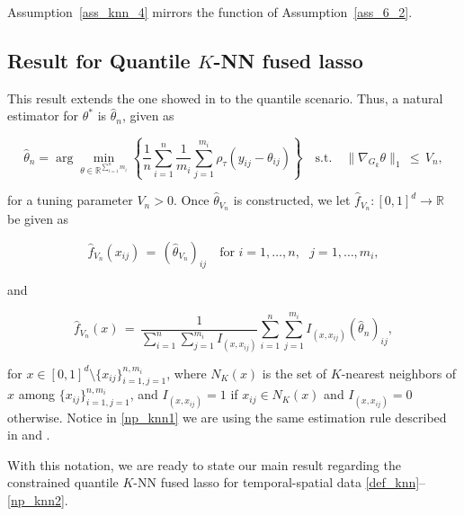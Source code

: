 \documentclass[twoside,11pt]{article}
\begin{document}
Assumption~\ref{ass_knn_4} mirrors the function of Assumption~\ref{ass_6_2}.



\subsection{Result for Quantile \( K \)-NN fused lasso}
This result extends the one showed in \cite{padilla2023temporal} to the quantile scenario. Thus, a natural estimator for \( \theta^* \) is \( \hat{\theta}_n \), given as

\begin{equation}
\label{def_knn}
\hat{\theta}_n = \arg\min_{\theta \in \mathbb{R}^{\sum_{i=1}^n m_i}} \left\{ \frac{1}{n} \sum_{i=1}^n \frac{1}{m_i} \sum_{j=1}^{m_i} \rho_{\tau}(y_{ij} - \theta_{ij}) \right\} \quad \text{s.t.} \quad \|\nabla_{G_k} \theta\|_1 \,\leq\, V_n,
\end{equation}

for a tuning parameter \( V_n > 0 \). Once \( \hat{\theta}_{V_n} \) is constructed, we let \( \hat{f}_{V_n} : [0,1]^d \to \mathbb{R} \) be given as

\begin{equation}
\label{np_knn1}
\hat{f}_{V_n}(x_{ij}) \,=\, (\hat{\theta}_{V_n})_{ij} \quad \text{for } i = 1, \ldots, n, \text{ } j = 1, \ldots, m_i,
\end{equation}

and

\begin{equation}
\label{np_knn2}
\hat{f}_{V_n}(x) \,=\, \frac{1}{\sum_{i=1}^n \sum_{j=1}^{m_i} I_{(x, x_{ij})}} \sum_{i=1}^n \sum_{j=1}^{m_i} I_{(x, x_{ij})} (\hat{\theta}_{n})_{ij},
\end{equation}

for \( x \in [0,1]^d \setminus \{x_{ij}\}_{i=1,j=1}^{n,m_i} \), where \( N_K(x) \) is the set of \( K \)-nearest neighbors of \( x \) among \( \{x_{ij}\}_{i=1,j=1}^{n,m_i} \), and \( I_{(x, x_{ij})} = 1 \) if \( x_{ij} \in N_K(x) \) and \( I_{(x, x_{ij})} = 0 \) otherwise. Notice in \eqref{np_knn1} we are using the same estimation rule described in \cite{madrid2020adaptive} and \cite{padilla2023temporal}.

With this notation, we are ready to state our main result regarding the constrained quantile \( K \)-NN fused lasso for temporal-spatial data \eqref{def_knn}--\eqref{np_knn2}.
\end{document}
